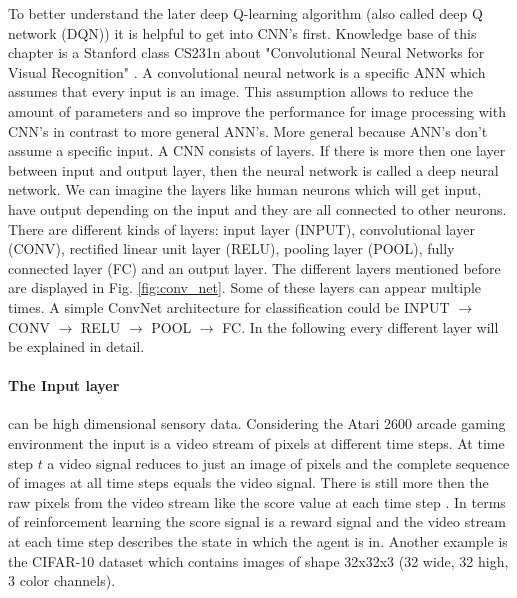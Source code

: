 \documentclass[conference]{IEEEtran}
\begin{document}
To better understand the later deep Q-learning algorithm (also called deep Q network (DQN)) \cite{mnih-atari-2013} it is helpful to get into CNN's first. Knowledge base of this chapter is a Stanford class CS231n about "Convolutional Neural Networks for Visual Recognition" \cite{KarpathyCNN}. A convolutional neural network is a specific ANN which assumes that every input is an image. This assumption allows to reduce the amount of parameters and so improve the performance for image processing with CNN's in contrast to more general ANN's. More general because ANN's don't assume a specific input. A CNN consists of layers. If there is more then one layer between input and output layer, then the neural network is called a deep neural network. We can imagine the layers like human neurons which will get input, have output depending on the input and they are all connected to other neurons. There are different kinds of layers: input layer (INPUT), convolutional layer (CONV), rectified linear unit layer (RELU), pooling layer (POOL), fully connected layer (FC) and an output layer. The different layers mentioned before are displayed in Fig. \ref{fig:conv_net}. Some of these layers can appear multiple times. A simple ConvNet architecture for classification could be INPUT $\rightarrow$ CONV $\rightarrow$ RELU $\rightarrow$ POOL $\rightarrow$ FC. In the following every different layer will be explained in detail.

\paragraph{The Input layer} can be high dimensional sensory data. Considering the Atari 2600 arcade gaming environment \cite{DBLP:journals/corr/MnihBMGLHSK16, DBLP:journals/corr/HasseltGS15, DRL:HumanLevelControl} the input is a video stream of pixels at different time steps. At time step $t$ a video signal reduces to just an image of pixels and the complete sequence of images at all time steps equals the video signal. There is still more then the raw pixels from the video stream like the score value at each time step \cite{DRL:HumanLevelControl}. In terms of reinforcement learning the score signal is a reward signal and the video stream at each time step describes the state in which the agent is in. Another example is the CIFAR-10 dataset which contains images of shape 32x32x3 (32 wide, 32 high, 3 color channels).
\end{document}
